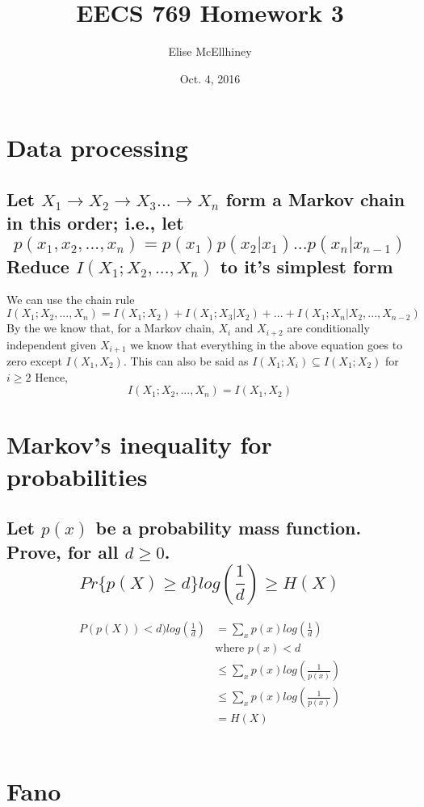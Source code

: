 \documentclass[11pt, oneside]{book}   	%
\title{EECS 769 Homework 3}
\author{Elise McEllhiney}
\date{Oct. 4, 2016}							%
\begin{document}
\maketitle

\section{Data processing}
\subsection*{Let $X_1 \rightarrow X_2 \rightarrow X_3 ... \rightarrow X_n$ form a Markov chain in this order; i.e., let 
$$p(x_1,x_2,...,x_n)=p(x_1)p(x_2|x_1)...p(x_n|x_{n-1})$$ 
Reduce $I(X_1;X_2,...,X_n)$ to it's simplest form}

We can use the chain rule
$$I(X_1;X_2,...,X_n) = I(X_1;X_2)+I(X_1;X_3|X_2)+...+I(X_1;X_n|X_2,...,X_{n-2})$$
By the  we know that, for a Markov chain, $X_i$ and $X_{i+2}$ are conditionally independent given $X_{i+1}$ we know that everything in the above equation goes to zero except $I(X_1,X_2)$.  This can also be said as $I(X_1;X_i) \subseteq I(X_1;X_2)$ for $i \geq 2$
Hence,
$$I(X_1;X_2,...,X_n)=I(X_1,X_2)$$

\section{Markov's inequality for probabilities}
\subsection*{Let $p(x)$ be a probability mass function.  Prove, for all $d \geq 0$. $$Pr\{p(X) \geq d\} log (\frac{1}{d}) \geq H(X)$$}

\begin{equation}\label{}
\begin{split}
P(p(X)) < d) log(\frac{1}{d}) & = \sum_{x} p(x)log(\frac{1}{d}) \\
& \text{where $p(x) < d$}\\
& \leq \sum_{x} p(x)log(\frac{1}{p(x)}) \\
& \leq \sum_{x} p(x)log(\frac{1}{p(x)}) \\
& = H(X)  
\end{split}
\end{equation}\\

\section{Fano}
\end{document}
